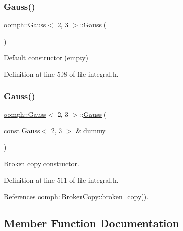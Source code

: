 \subsubsection{\texorpdfstring{Gauss()}{Gauss()}\hspace{0.1cm}{\footnotesize\ttfamily [1/2]}}
{\footnotesize\ttfamily \hyperlink{classoomph_1_1Gauss}{oomph\+::\+Gauss}$<$ 2, 3 $>$\+::\hyperlink{classoomph_1_1Gauss}{Gauss} (\begin{DoxyParamCaption}{ }\end{DoxyParamCaption})\hspace{0.3cm}{\ttfamily [inline]}}



Default constructor (empty) 



Definition at line 508 of file integral.\+h.

\mbox{\label{classoomph_1_1Gauss_3_012_00_013_01_4_a3f761b325c1dcf595066940e777fba45}} 
\subsubsection{\texorpdfstring{Gauss()}{Gauss()}\hspace{0.1cm}{\footnotesize\ttfamily [2/2]}}
{\footnotesize\ttfamily \hyperlink{classoomph_1_1Gauss}{oomph\+::\+Gauss}$<$ 2, 3 $>$\+::\hyperlink{classoomph_1_1Gauss}{Gauss} (\begin{DoxyParamCaption}\item[{const \hyperlink{classoomph_1_1Gauss}{Gauss}$<$ 2, 3 $>$ \&}]{dummy }\end{DoxyParamCaption})\hspace{0.3cm}{\ttfamily [inline]}}



Broken copy constructor. 



Definition at line 511 of file integral.\+h.



References oomph\+::\+Broken\+Copy\+::broken\+\_\+copy().



\subsection{Member Function Documentation}
\mbox{\label{classoomph_1_1Gauss_3_012_00_013_01_4_a1b63b54a5cad907415238c2d73003c3d}} 
